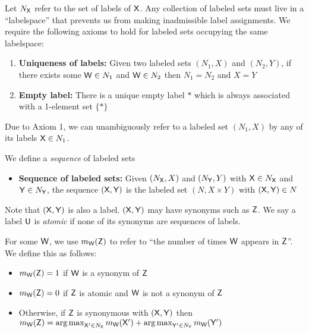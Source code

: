 Let $N_{\mathsf{X}}$ refer to the set of labels of $\mathsf{X}$. Any collection of labeled sets must live in a ``labelspace'' that prevents us from making inadmissible label assignments. We require the following axioms to hold for labeled sets occupying the same labelspace:

\begin{enumerate}
	\item \textbf{Uniqueness of labels:} Given two labeled sets $(N_1,X)$ and $(N_2,Y)$, if there exists some $\mathsf{W}\in N_1$ and $\mathsf{W}\in N_2$ then $N_1=N_2$ and $X=Y$
	\item \textbf{Empty label:} There is a unique empty label $*$ which is always associated with a 1-element set $\{*\}$
\end{enumerate}

Due to Axiom 1, we can unambiguously refer to a labeled set $(N_1,X)$ by any of its labels $\mathsf{X}\in N_1$. 

We define a \emph{sequence} of labeled sets

\begin{itemize}
	\item \textbf{Sequence of labeled sets:} Given $(N_{\mathsf{X}},X)$ and $(N_{\mathsf{Y}},Y)$ with $\mathsf{X}\in N_{\mathsf{X}}$ and $\mathsf{Y}\in N_{\mathsf{Y}}$, the sequence $(\mathsf{X}, \mathsf{Y})$ is the labeled set $(N,X\times Y)$ with $(\mathsf{X},\mathsf{Y})\in N$
\end{itemize}

Note that $(\mathsf{X},\mathsf{Y})$ is also a label. $(\mathsf{X},\mathsf{Y})$ may have synonyms such as $\mathsf{Z}$. We say a label $\mathsf{U}$ is \emph{atomic} if none of its synonyms are sequences of labels.

For some $\mathsf{W}$, we use $m_{\mathsf{W}}(\mathsf{Z})$ to refer to ``the number of times $\mathsf{W}$ appears in $\mathsf{Z}$''. We define this as follows:

\begin{itemize}
	\item $m_{\mathsf{W}}(\mathsf{Z})=1$ if $\mathsf{W}$ is a synonym of $\mathsf{Z}$
	\item $m_{\mathsf{W}}(\mathsf{Z})=0$ if $\mathsf{Z}$ is atomic and $\mathsf{W}$ is not a synonym of $\mathsf{Z}$
	\item Otherwise, if $\mathsf{Z}$ is synonymous with $(\mathsf{X},\mathsf{Y})$ then $m_{\mathsf{W}}(\mathsf{Z})=\operatorname*{arg\,max}_{\mathsf{X}'\in N_{\mathsf{X}}} m_{\mathsf{W}}(\mathsf{X}') + \operatorname*{arg\,max}_{\mathsf{Y}'\in N_{\mathsf{Y}}} m_{\mathsf{W}}(\mathsf{Y}')$
\end{itemize}


